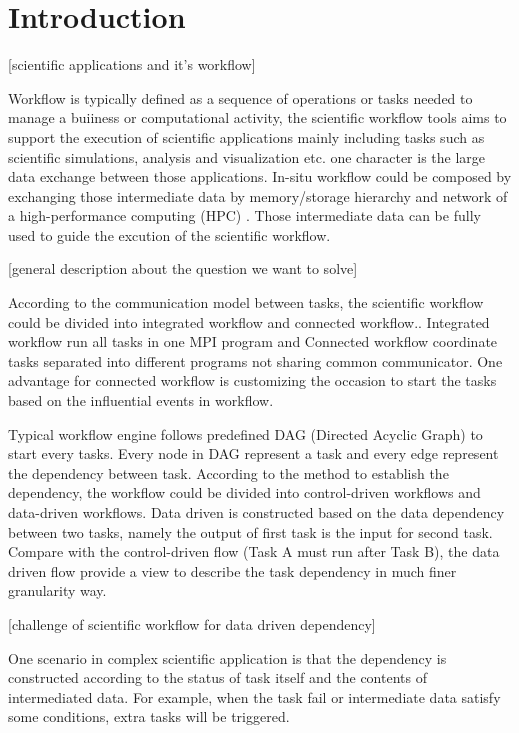 \section{Introduction}

[scientific applications and it's workflow]


Workflow is typically defined as a sequence of operations or tasks needed to manage a buiiness or computational activity, the scientific workflow tools aims to support the execution of scientific applications mainly including tasks such as scientific simulations, analysis and visualization etc. one character is the large data exchange between those applications. In-situ workflow could be composed by exchanging those intermediate data by memory/storage hierarchy and network of a high-performance computing (HPC) \cite{deelman2018future}. Those intermediate data can be fully used to guide the excution of the scientific workflow.  


[general description about the question we want to solve]

According to the communication model between tasks, the scientific workflow could be divided into integrated workflow and connected workflow.\cite{dreher2017situ}. Integrated workflow run all tasks in one MPI program and Connected workflow coordinate tasks separated into different programs not sharing common communicator. One advantage for connected workflow is customizing the occasion to start the tasks based on the influential events in workflow.

Typical workflow engine follows predefined DAG (Directed Acyclic Graph) to start every tasks. Every node in DAG represent a task and every edge represent the dependency between task. According to the method to establish the dependency, the workflow could be divided into control-driven workflows and data-driven workflows\cite{shields2007control}. Data driven is constructed based on the data dependency between two tasks, namely the output of first task is the input for second task. Compare with the control-driven flow (Task A must run after Task B), the data driven flow provide a view to describe the task dependency in much finer granularity way.

[challenge of scientific workflow for data driven dependency]

One scenario in complex scientific application is that the dependency is constructed according to the status of task itself and the contents of intermediated data. For example, when the task fail or intermediate data satisfy some conditions, extra tasks will be triggered. 

